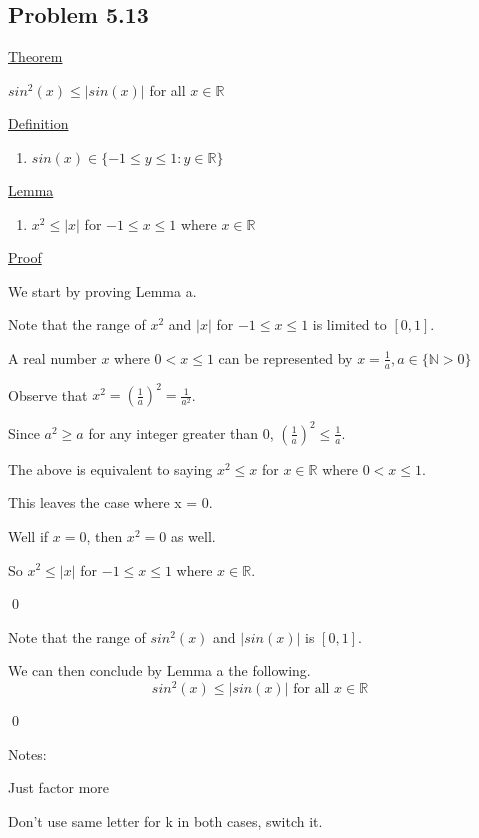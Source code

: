 \documentclass{article}
\begin{document}
\pagebreak


\subsection{Problem 5.13}
\underline{Theorem}
\begin{addmargin}[0.75cm]{0cm}
	$sin^2(x) \leq |sin(x)|$ for all $x \in \mathbb{R}$
\end{addmargin}

\underline{Definition}
\renewcommand{\labelenumi}{(\alph{enumi})}
\begin{enumerate}[leftmargin=1.35cm]
	\item $sin(x) \in \{-1 \leq y \leq 1 : y \in \mathbb{R}\}$
\end{enumerate}

\underline{Lemma}
\begin{enumerate}[leftmargin=1.35cm]
	\item $x^2 \leq |x|$ for $-1 \leq x \leq 1$ where $x \in \mathbb{R}$
\end{enumerate}

\underline{Proof}
\begin{addmargin}[0.75cm]{0cm}
	We start by proving Lemma a.
	
	Note that the range of $x^2$ and $|x|$ for $-1 \leq x \leq 1$ is limited to $[0,1]$.
	
	A real number $x$ where $0 < x \leq 1$ can be represented by $x = \frac{1}{a}, a \in \{\mathbb{N}>0\}$
	
	Observe that $x^2 = (\frac{1}{a})^2 = \frac{1}{a^2}$.
	
	Since $a^2 \geq a$ for any integer greater than 0, $(\frac{1}{a})^2 \leq \frac{1}{a}$.
	
	The above is equivalent to saying $x^2 \leq x$ for $x \in \mathbb{R}$ where $0 < x \leq 1$.
	
	This leaves the case where x = 0. 
	
	Well if $x = 0$, then $x^2 = 0$ as well.
	
	So $x^2 \leq |x|$ for $-1 \leq x \leq 1$ where $x \in \mathbb{R}$.
	
	\qed
	
	Note that the range of $sin^2(x)$ and $|sin(x)|$ is $[0,1]$.
	
	We can then conclude by Lemma a the following.
	\begin{equation}
		sin^2(x) \leq |sin(x)| \text{ for all } x \in \mathbb{R}
	\end{equation}	
	
	\qed
	
	Notes:
	
	Just factor more
	
	Don't use same letter for k in both cases, switch it.
\end{addmargin}
\end{document}
